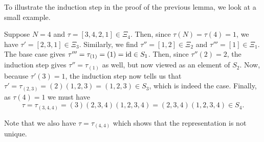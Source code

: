 To illustrate the induction step in the proof of the previous lemma, we look at a small
example.
\begin{example}

	Suppose $N = 4$ and $\tau = [3,4,2,1] \in \Xi_4$. Then, since $\tau(N) = \tau(4) = 1$,
	we have $\tau' = [2,3,1] \in \Xi_{3}$. Similarly, we find $\tau'' = [1,2] \in \Xi_2$
	and $\tau''' = [1] \in \Xi_1$. The base case gives $\tau''' = \tau_{(1)} = (1) = \operatorname{id}
		\in S_1$. Then, since $\tau''(2) = 2$, the induction step gives $\tau'' = \tau_{(1)}$
	as well, but now viewed as an element of $S_2$. Now, because $\tau'(3) = 1$, the
	induction step now tells us that $\tau' = \tau_{(2,3)} = (2)(1,2,3) = (1,2,3) \in S_3$,
	which is indeed the case. Finally, as $\tau(4) = 1$ we must have
	\begin{equation*}
		\tau = \tau_{(3,4,4)} = (3)(2,3,4)(1,2,3,4) = (2,3,4)(1,2,3,4) \in S_4.
	\end{equation*}

	Note that we also have $\tau = \tau_{(4,4)}$ which shows that the representation is not
	unique.
\end{example}

